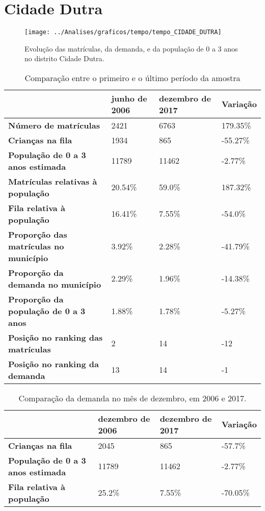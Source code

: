 \section{Cidade Dutra}
\begin{figure}[H]
\centering
\texttt{[image: ../Analises/graficos/tempo/tempo\_CIDADE\_DUTRA]}
\caption{Evolução das matrículas, da demanda, e da população de 0 a 3 anos no distrito Cidade Dutra.}
\end{figure}
\begin{table}[H]
\begin{tabular}{|l|l|l|l|}
\hline
\textbf{}                                      & \textbf{junho de 2006}       & \textbf{dezembro de 2017}    & \textbf{Variação} \\ \hline
\textbf{Número de matrículas}                  & 2421 & 6763 & 179.35\% \\ \hline
\textbf{Crianças na fila}                      & 1934 & 865 & -55.27\% \\ \hline
\textbf{População de 0 a 3 anos estimada}      & 11789 & 11462 & -2.77\% \\ \hline
\textbf{Matrículas relativas à população}      & 20.54\% & 59.0\% & 187.32\% \\ \hline
\textbf{Fila relativa à população}             & 16.41\% & 7.55\% & -54.0\% \\ \hline
\textbf{Proporção das matrículas no município} & 3.92\% & 2.28\% & -41.79\% \\ \hline
\textbf{Proporção da demanda no município}     & 2.29\% & 1.96\% & -14.38\% \\ \hline
\textbf{Proporção da população de 0 a 3 anos}  & 1.88\% & 1.78\% & -5.27\% \\ \hline
\textbf{Posição no ranking das matrículas}     & 2 & 14 & -12 \\ \hline
\textbf{Posição no ranking da demanda}         & 13 & 14 & -1 \\ \hline
\end{tabular}
\caption{Comparação entre o primeiro e o último período da amostra}
\end{table}
\begin{table}[H]
\begin{tabular}{|l|l|l|l|}
\hline
\textbf{}                                 & \textbf{dezembro de 2006} & \textbf{dezembro de 2017} & \textbf{Variação} \\ \hline
\textbf{Crianças na fila}                      & 2045 & 865 & -57.7\% \\ \hline
\textbf{População de 0 a 3 anos estimada}      & 11789 & 11462 & -2.77\% \\ \hline
\textbf{Fila relativa à população}             & 25.2\% & 7.55\% & -70.05\% \\ \hline
\end{tabular}
\caption{Comparação da demanda no mês de dezembro, em 2006 e 2017.}
\end{table}
